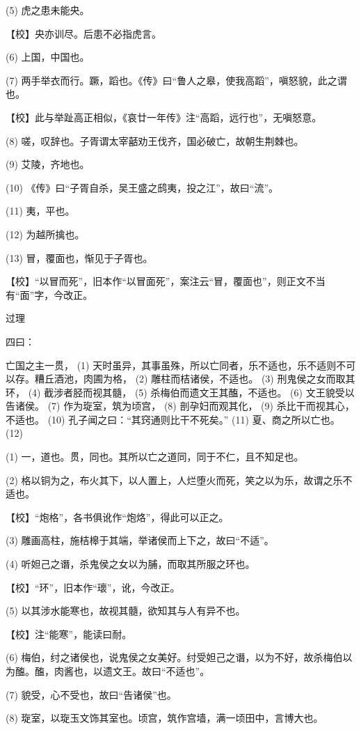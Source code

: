\documentclass[12pt,UTF8]{ctexbook}
\begin{document}
(5) 虎之患未能央。

【校】央亦训尽。后患不必指虎言。

(6) 上国，中国也。

(7) 两手举衣而行。蹶，蹈也。《传》曰“鲁人之皋，使我高蹈”，嗔怒貌，此之谓也。

【校】此与举趾高正相似，《哀廿一年传》注“高蹈，远行也”，无嗔怒意。

(8) 嗟，叹辞也。子胥谓太宰嚭劝王伐齐，国必破亡，故朝生荆棘也。

(9) 艾陵，齐地也。

(10) 《传》曰“子胥自杀，吴王盛之鸱夷，投之江”，故曰“流”。

(11) 夷，平也。

(12) 为越所擒也。

(13) 冒，覆面也，惭见于子胥也。

【校】“以冒而死”，旧本作“以冒面死”，案注云“冒，覆面也”，则正文不当有“面”字，今改正。





过理


四曰：

亡国之主一贯， (1) 天时虽异，其事虽殊，所以亡同者，乐不适也，乐不适则不可以存。糟丘酒池，肉圃为格， (2) 雕柱而桔诸侯，不适也。 (3) 刑鬼侯之女而取其环， (4) 截涉者胫而视其髓， (5) 杀梅伯而遗文王其醢，不适也。 (6) 文王貌受以告诸侯。 (7) 作为琁室，筑为顷宫， (8) 剖孕妇而观其化， (9) 杀比干而视其心，不适也。 (10) 孔子闻之曰：“其窍通则比干不死矣。” (11) 夏、商之所以亡也。 (12)

(1) 一，道也。贯，同也。其所以亡之道同，同于不仁，且不知足也。

(2) 格以铜为之，布火其下，以人置上，人烂堕火而死，笑之以为乐，故谓之乐不适也。

【校】“炮格”，各书俱讹作“炮烙”，得此可以正之。

(3) 雕画高柱，施桔槔于其端，举诸侯而上下之，故曰“不适”。

(4) 听妲己之谮，杀鬼侯之女以为脯，而取其所服之环也。

【校】“环”，旧本作“瓌”，讹，今改正。

(5) 以其涉水能寒也，故视其髓，欲知其与人有异不也。

【校】注“能寒”，能读曰耐。

(6) 梅伯，纣之诸侯也，说鬼侯之女美好。纣受妲己之谮，以为不好，故杀梅伯以为醢。醢，肉酱也，以遗文王。故曰“不适也”。

(7) 貌受，心不受也，故曰“告诸侯”也。

(8) 琁室，以琁玉文饰其室也。顷宫，筑作宫墙，满一顷田中，言博大也。
\end{document}
